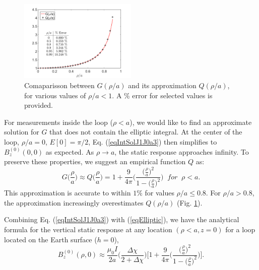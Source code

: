 \documentclass[journal]{IEEEtran}  %
\begin{document}
\begin{figure}[!t]
\centering
\includegraphics[width=0.50\textwidth]{DCowanVRM2017/imagesColor/figElliptic.png}
\caption{Comaparisson between $G(\rho /a)$  and its
approximation $Q(\rho /a)$, for various values of $\rho /a < 1$. A
\% error for selected values is provided.} \label{figElliptic}
\end{figure}
%

For measurements inside the loop ($\rho <a$), we would like to find
an approximate solution for $G$ that does not contain the elliptic
integral. At the center of the loop, $\rho /a =0$, $E[0]= \pi /2$,
Eq. (\ref{eqIntSolJ1J0a3}) then simplifies to $B_z^{(0)} (0,0)$ as
expected. As $\rho \rightarrow a$, the static response approaches
infinity. To preserve these properties, we suggest an empirical
function $Q$ as:
\begin{equation}
\label{eqElliptic} G \Big ( \frac{\rho}{a} \Big ) \approx Q \Big (
\frac{\rho}{a} \Big ) = 1 + \frac{9}{4\pi} \Bigg ( \frac{\big(
\frac{\rho}{a} \big )^2}{1- \big( \frac{\rho}{a} \big )^2} \Bigg )
\; \; for \; \; \rho < a.
\end{equation}
This approximation  is accurate to within $1\% $ for values $\rho /
a \leq 0.8$. For $\rho /a > 0.8$, the approximation increasingly
overestimates $Q (\rho /a)$ (Fig. \ref{figElliptic}).

Combining Eq. (\ref{eqIntSolJ1J0a3}) with (\ref{eqElliptic}), we
have the analytical formula for the vertical static response at any
location $(\rho < a,z=0)$ for a loop located on the Earth surface
($h=0$),
\begin{equation}
B^{(0)}_z(\rho,0) \approx \frac{\mu_0 I}{2a}  \Bigg ( \frac{\Delta
\chi}{2+\Delta \chi} \Bigg ) \Bigg [ 1 + \frac{9}{4\pi} \Bigg (
\frac{\big( \frac{\rho}{a} \big )^2}{1- \big( \frac{\rho}{a} \big
)^2} \Bigg ) \Bigg ]. \label{eqStaticLoopBz}
\end{equation}
\\\\
\end{document}
